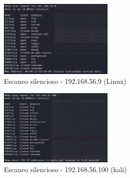 \documentclass[a4paper,12pt]{article} %
\begin{document}
\newpage
        \begin{figure} [hp!]
         \centering
         \includegraphics[width=0.5\textwidth]{Imagenes/sil3.png}
         \caption{Escaneo silencioso - 192.168.56.9 (Linux)}
         \label{fig:wireshark2}
        \end{figure}
        
        \begin{figure} [hp!]
         \centering
         \includegraphics[width=0.5\textwidth]{Imagenes/sil4.png}
         \caption{Escaneo silencioso - 192.168.56.100 (kali)}
         \label{fig:wireshark2}
        \end{figure}
\end{document}
